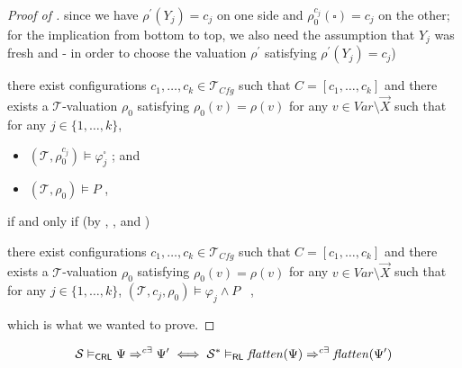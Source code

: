 \begin{proof}[Proof of ]
    since we have $\rho^\prime(Y_j) = c_j$
    on one side and $\rho_0^{c_j}(\square) = c_j$ on the other; for the implication from bottom to top,
    we also need the assumption that $Y_j$ was fresh and  -
    in order to choose the valuation $\rho^\prime$ satisfying $\rho^\prime(Y_j) = c_j$)
    \begin{proofenv}
        there exist configurations $c_1, \ldots, c_k \in \mathcal{T}_{\mathit{Cfg}}$ such that
        $C = [c_1, \ldots, c_k]$ and there exists a $\mathcal{T}$-valuation $\rho_0$
        satisfying $\rho_0(v) = \rho(v)$ for any $v \in \mathit{Var} \setminus \vec{X}$
        such that for any $j \in \{ 1, \ldots, k \}$,
        \begin{itemize}
            \item $(\mathcal{T}, \rho_0^{c_j}) \vDash \varphi_j^{\square}$ ; and
            \item $(\mathcal{T}, \rho_0) \vDash P$ ,
        \end{itemize}
    \end{proofenv}
    if and only if (by , , and )
    \begin{proofenv}
        there exist configurations $c_1, \ldots, c_k \in \mathcal{T}_{\mathit{Cfg}}$ such that
        $C = [c_1, \ldots, c_k]$ and there exists a $\mathcal{T}$-valuation $\rho_0$
        satisfying $\rho_0(v) = \rho(v)$ for any $v \in \mathit{Var} \setminus \vec{X}$
        such that for any $j \in \{ 1, \ldots, k \}$,
        $(\mathcal{T}, c_j, \rho_0) \vDash \varphi_j \land P$ \, ,
    \end{proofenv}
    which is what we wanted to prove.
\end{proof}


\begin{lemma}\label{thm:correspondence}
\begin{equation*}
\mathcal{S} \vDash_{\mathsf{CRL}} \Psi \Rightarrow^{c\exists} \Psi^\prime
  \iff \mathcal{S}^* \vDash_{\mathsf{RL}} \mathit{flatten}(\Psi) \Rightarrow^{c\exists} \mathit{flatten}(\Psi^\prime)
\end{equation*}
\end{lemma}

